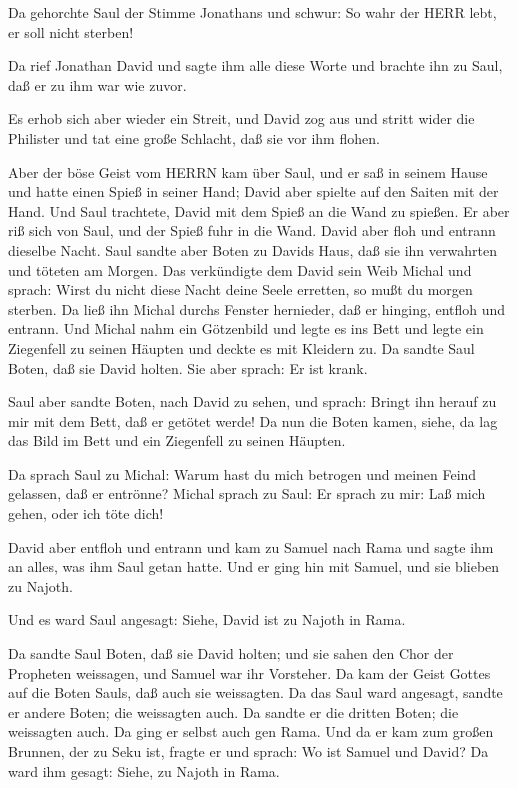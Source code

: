  Da gehorchte Saul der Stimme Jonathans und schwur: So wahr
der HERR lebt, er soll nicht sterben!

 Da rief Jonathan David und sagte ihm alle diese Worte und
brachte ihn zu Saul, daß er zu ihm war wie zuvor.

 Es erhob sich aber wieder ein Streit, und David zog aus und
stritt wider die Philister und tat eine große Schlacht, daß sie vor ihm
flohen.

 Aber der böse Geist vom HERRN kam über Saul, und er saß in
seinem Hause und hatte einen Spieß in seiner Hand; David aber spielte
auf den Saiten mit der Hand.  Und Saul trachtete, David mit
dem Spieß an die Wand zu spießen. Er aber riß sich von Saul, und der
Spieß fuhr in die Wand. David aber floh und entrann dieselbe Nacht.
 Saul sandte aber Boten zu Davids Haus, daß sie ihn
verwahrten und töteten am Morgen. Das verkündigte dem David sein Weib
Michal und sprach: Wirst du nicht diese Nacht deine Seele erretten, so
mußt du morgen sterben.  Da ließ ihn Michal durchs Fenster
hernieder, daß er hinging, entfloh und entrann.  Und Michal
nahm ein Götzenbild und legte es ins Bett und legte ein Ziegenfell zu
seinen Häupten und deckte es mit Kleidern zu.  Da sandte
Saul Boten, daß sie David holten. Sie aber sprach: Er ist krank.

 Saul aber sandte Boten, nach David zu sehen, und sprach:
Bringt ihn herauf zu mir mit dem Bett, daß er getötet werde!
 Da nun die Boten kamen, siehe, da lag das Bild im Bett und
ein Ziegenfell zu seinen Häupten.

 Da sprach Saul zu Michal: Warum hast du mich betrogen und
meinen Feind gelassen, daß er entrönne? Michal sprach zu Saul: Er sprach
zu mir: Laß mich gehen, oder ich töte dich!

 David aber entfloh und entrann und kam zu Samuel nach Rama
und sagte ihm an alles, was ihm Saul getan hatte. Und er ging hin mit
Samuel, und sie blieben zu Najoth.

 Und es ward Saul angesagt: Siehe, David ist zu Najoth in
Rama.

 Da sandte Saul Boten, daß sie David holten; und sie sahen
den Chor der Propheten weissagen, und Samuel war ihr Vorsteher. Da kam
der Geist Gottes auf die Boten Sauls, daß auch sie weissagten.
 Da das Saul ward angesagt, sandte er andere Boten; die
weissagten auch. Da sandte er die dritten Boten; die weissagten auch.
 Da ging er selbst auch gen Rama. Und da er kam zum großen
Brunnen, der zu Seku ist, fragte er und sprach: Wo ist Samuel und David?
Da ward ihm gesagt: Siehe, zu Najoth in Rama.

